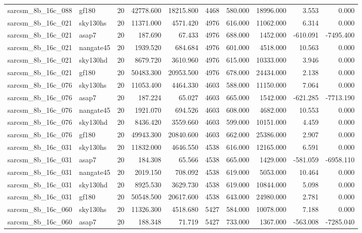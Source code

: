 \begin{tabular}{llrrrrrrrr}
sarcsm\_8b\_16c\_088 & gf180 & 20 & 42778.600 & 18215.800 & 4468 & 580.000 & 18996.000 & 3.553 & 0.000 \\
sarcsm\_8b\_16c\_021 & sky130hs & 20 & 11371.000 & 4571.420 & 4976 & 616.000 & 11062.000 & 6.314 & 0.000 \\
sarcsm\_8b\_16c\_021 & asap7 & 20 & 187.690 & 67.433 & 4976 & 688.000 & 1452.000 & -610.091 & -7495.400 \\
sarcsm\_8b\_16c\_021 & nangate45 & 20 & 1939.520 & 684.684 & 4976 & 601.000 & 4518.000 & 10.563 & 0.000 \\
sarcsm\_8b\_16c\_021 & sky130hd & 20 & 8679.720 & 3610.960 & 4976 & 615.000 & 10333.000 & 3.946 & 0.000 \\
sarcsm\_8b\_16c\_021 & gf180 & 20 & 50483.300 & 20953.500 & 4976 & 678.000 & 24434.000 & 2.138 & 0.000 \\
sarcsm\_8b\_16c\_076 & sky130hs & 20 & 11053.400 & 4464.330 & 4603 & 588.000 & 11150.000 & 7.064 & 0.000 \\
sarcsm\_8b\_16c\_076 & asap7 & 20 & 187.224 & 65.027 & 4603 & 665.000 & 1542.000 & -621.285 & -7713.190 \\
sarcsm\_8b\_16c\_076 & nangate45 & 20 & 1921.070 & 694.526 & 4603 & 608.000 & 4682.000 & 10.553 & 0.000 \\
sarcsm\_8b\_16c\_076 & sky130hd & 20 & 8436.420 & 3559.660 & 4603 & 599.000 & 10151.000 & 4.459 & 0.000 \\
sarcsm\_8b\_16c\_076 & gf180 & 20 & 49943.300 & 20840.600 & 4603 & 662.000 & 25386.000 & 2.907 & 0.000 \\
sarcsm\_8b\_16c\_031 & sky130hs & 20 & 11832.000 & 4646.550 & 4538 & 616.000 & 12165.000 & 6.591 & 0.000 \\
sarcsm\_8b\_16c\_031 & asap7 & 20 & 184.308 & 65.566 & 4538 & 665.000 & 1429.000 & -581.059 & -6958.110 \\
sarcsm\_8b\_16c\_031 & nangate45 & 20 & 2019.150 & 708.092 & 4538 & 619.000 & 5053.000 & 10.464 & 0.000 \\
sarcsm\_8b\_16c\_031 & sky130hd & 20 & 8925.530 & 3629.730 & 4538 & 619.000 & 10844.000 & 5.098 & 0.000 \\
sarcsm\_8b\_16c\_031 & gf180 & 20 & 50548.500 & 20617.600 & 4538 & 643.000 & 24980.000 & 2.781 & 0.000 \\
sarcsm\_8b\_16c\_060 & sky130hs & 20 & 11326.300 & 4518.680 & 5427 & 584.000 & 10078.000 & 7.188 & 0.000 \\
sarcsm\_8b\_16c\_060 & asap7 & 20 & 188.348 & 71.719 & 5427 & 733.000 & 1367.000 & -563.008 & -7285.040 \\

\end{tabular}
